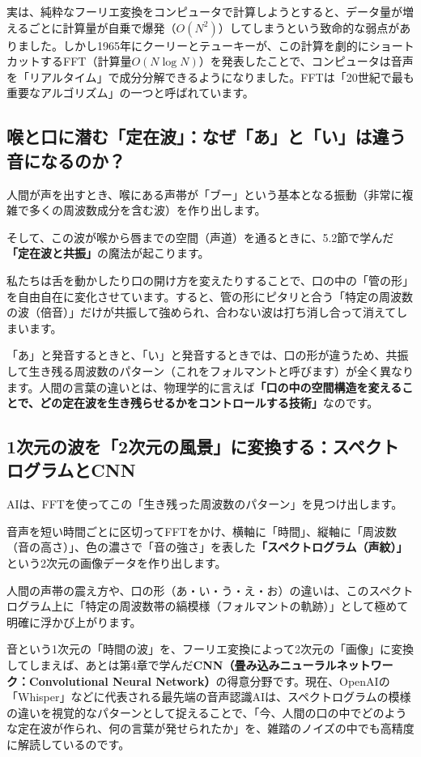 実は、純粋なフーリエ変換をコンピュータで計算しようとすると、データ量が増えるごとに計算量が自乗で爆発（\(O(N^2)\)）してしまうという致命的な弱点がありました。しかし1965年にクーリーとテューキーが、この計算を劇的にショートカットするFFT（計算量\(O(N \log N)\)）を発表したことで、コンピュータは音声を「リアルタイム」で成分分解できるようになりました。FFTは「20世紀で最も重要なアルゴリズム」の一つと呼ばれています。

\subsection{喉と口に潜む「定在波」：なぜ「あ」と「い」は違う音になるのか？}

人間が声を出すとき、喉にある声帯が「ブー」という基本となる振動（非常に複雑で多くの周波数成分を含む波）を作り出します。

そして、この波が喉から唇までの空間（声道）を通るときに、5.2節で学んだ\textbf{「定在波と共振」}の魔法が起こります。

私たちは舌を動かしたり口の開け方を変えたりすることで、口の中の「管の形」を自由自在に変化させています。すると、管の形にピタリと合う「特定の周波数の波（倍音）」だけが共振して強められ、合わない波は打ち消し合って消えてしまいます。

「あ」と発音するときと、「い」と発音するときでは、口の形が違うため、共振して生き残る周波数のパターン（これをフォルマントと呼びます）が全く異なります。人間の言葉の違いとは、物理学的に言えば\textbf{「口の中の空間構造を変えることで、どの定在波を生き残らせるかをコントロールする技術」}なのです。

\subsection{1次元の波を「2次元の風景」に変換する：スペクトログラムとCNN}

AIは、FFTを使ってこの「生き残った周波数のパターン」を見つけ出します。

音声を短い時間ごとに区切ってFFTをかけ、横軸に「時間」、縦軸に「周波数（音の高さ）」、色の濃さで「音の強さ」を表した\textbf{「スペクトログラム（声紋）」}という2次元の画像データを作り出します。

人間の声帯の震え方や、口の形（あ・い・う・え・お）の違いは、このスペクトログラム上に「特定の周波数帯の縞模様（フォルマントの軌跡）」として極めて明確に浮かび上がります。

音という1次元の「時間の波」を、フーリエ変換によって2次元の「画像」に変換してしまえば、あとは第4章で学んだ\textbf{CNN（畳み込みニューラルネットワーク：Convolutional Neural Network）}の得意分野です。現在、OpenAIの「Whisper」などに代表される最先端の音声認識AIは、スペクトログラムの模様の違いを視覚的なパターンとして捉えることで、「今、人間の口の中でどのような定在波が作られ、何の言葉が発せられたか」を、雑踏のノイズの中でも高精度に解読しているのです。

